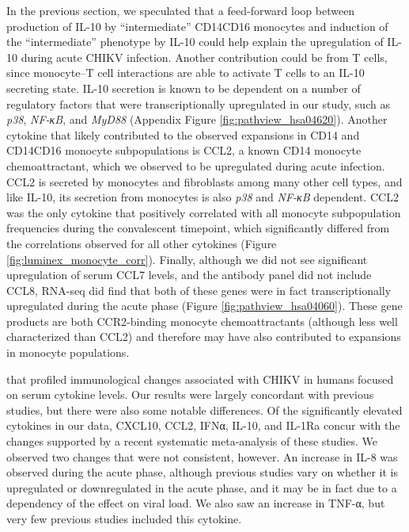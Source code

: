 In the previous section, we speculated that a feed-forward loop between production of IL-10 by “intermediate” CD14\sups{++}\allowbreak CD16\sups{+} monocytes\autocite{Skrzeczynska-Moncznik2008} and induction of the “intermediate” phenotype by IL-10\autocite{Tsukamoto2017} could help explain the upregulation of IL-10 during acute CHIKV infection. Another contribution could be from T cells, since monocyte–T cell interactions are able to activate T cells to an IL-10 secreting state.\autocite{Charron2015} IL-10 secretion is known to be dependent on a number of regulatory factors that were transcriptionally upregulated in our study, such as \emph{p38}, \emph{NF-κΒ}, and \emph{MyD88} (Appendix Figure \ref{fig:pathview_hsa04620}).\autocite{Saraiva2010} Another cytokine that likely contributed to the observed expansions in CD14\sups{+} and CD14\sups{+}\allowbreak CD16\sups{+} monocyte subpopulations is CCL2, a known CD14\sups{+} monocyte chemoattractant,\autocite{Serbina2008} which we observed to be upregulated during acute infection. CCL2 is secreted by monocytes and fibroblasts among many other cell types,\autocite{VanDamme1994} and like IL-10, its secretion from monocytes is also \emph{p38} and \emph{NF-κB} dependent.\autocite{Fietta2002} CCL2 was the only cytokine that positively correlated with all monocyte subpopulation frequencies during the convalescent timepoint, which significantly differed from the correlations observed for all other cytokines (Figure \ref{fig:luminex_monocyte_corr}). Finally, although we did not see significant upregulation of serum CCL7 levels, and the antibody panel did not include CCL8, RNA-seq did find that both of these genes were in fact transcriptionally upregulated during the acute phase (Figure \ref{fig:pathview_hsa04060}). These gene products are both CCR2-binding monocyte chemoattractants (although less well characterized than CCL2) and therefore may have also contributed to expansions in monocyte populations.

 that profiled immunological changes associated with CHIKV in humans focused on serum cytokine levels. Our results were largely concordant with previous studies, but there were also some notable differences. Of the significantly elevated cytokines in our data, CXCL10, CCL2, IFNα, IL-10, and IL-1Ra concur with the changes supported by a recent systematic meta-analysis of these studies.\autocite{Teng2015} We observed two changes that were not consistent, however. An increase in IL-8 was observed during the acute phase, although previous studies vary on whether it is upregulated or downregulated in the acute phase, and it may be in fact due to a dependency of the effect on viral load.\autocite{Teng2015} We also saw an increase in TNF-α, but very few previous studies included this cytokine.

